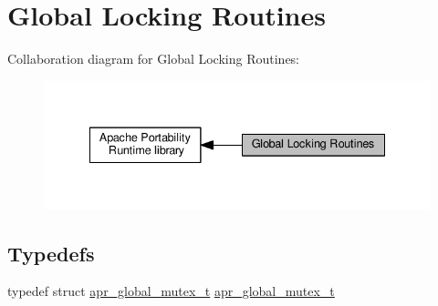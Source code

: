 \hypertarget{group__APR__GlobalMutex}{}\section{Global Locking Routines}
\label{group__APR__GlobalMutex}
Collaboration diagram for Global Locking Routines\+:
\nopagebreak
\begin{figure}[H]
\begin{center}
\leavevmode
\includegraphics[width=335pt]{group__APR__GlobalMutex}
\end{center}
\end{figure}
\subsection*{Typedefs}
\begin{DoxyCompactItemize}
\item 
typedef struct \hyperlink{structapr__global__mutex__t}{apr\+\_\+global\+\_\+mutex\+\_\+t} \hyperlink{group__APR__GlobalMutex_ga3fc7dc5b076533ee566aa4888ac35ee7}{apr\+\_\+global\+\_\+mutex\+\_\+t}
\end{DoxyCompactItemize}
